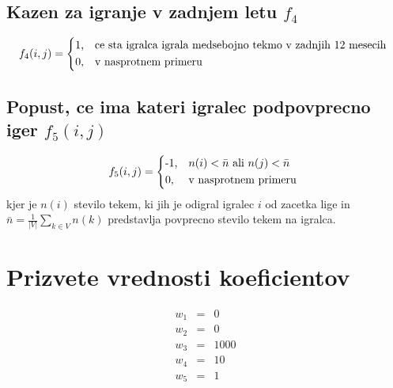 \documentclass[a4paper, 11pt]{article}
\newcommand*\mean[1]{\bar{#1}}
\begin{document}
\subsection{Kazen za igranje v zadnjem letu $f_4$}

\begin{equation}
	f_4(i,j) = 
		\begin{dcases*}
			\text{1,} & ce sta igralca igrala medsebojno tekmo v zadnjih 12 mesecih \\
			\text{0,} & v nasprotnem primeru
		\end{dcases*}
\end{equation}

\subsection{Popust, ce ima kateri igralec podpovprecno iger $f_5(i,j)$}

\begin{equation}
	f_5(i,j) = 
		\begin{dcases*}
			\text{-1,} & $n(i) < \mean{n}$ ali $n(j) < \mean{n}$ \\
			\text{0,} & v nasprotnem primeru
		\end{dcases*}
\end{equation}
kjer je $n(i)$ stevilo tekem, ki jih je odigral igralec $i$ od zacetka lige in $\mean{n} = \frac{1}{\left|V\right|}\sum_{k \in V}n(k)$ predstavlja povprecno stevilo tekem na igralca.


\section{Prizvete vrednosti koeficientov}
\begin{eqnarray}
	w_1 &=& 0 \\ \nonumber
	w_2 &=& 0 \\ \nonumber
	w_3 &=& 1000 \\ \nonumber
	w_4 &=& 10 \\ \nonumber
	w_5 &=& 1
\end{eqnarray}
\end{document}
